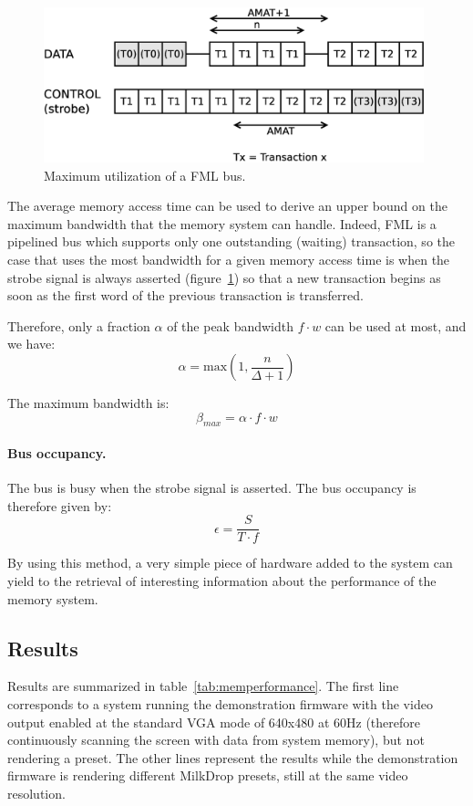 \documentclass[a4paper,11pt]{kthesis}
\begin{document}
\begin{figure}
\centering
\includegraphics[height=45mm]{fmlmax.eps}
\caption{Maximum utilization of a FML bus.} \label{fig:fmlmax}
\end{figure}

The average memory access time can be used to derive an upper bound on the maximum bandwidth that the memory system can handle. Indeed, FML is a pipelined bus which supports only one outstanding (waiting) transaction, so the case that uses the most bandwidth for a given memory access time is when the strobe signal is always asserted (figure~\ref{fig:fmlmax}) so that a new transaction begins as soon as the first word of the previous transaction is transferred.

Therefore, only a fraction $\alpha$ of the peak bandwidth $f \cdot w$ can be used at most, and we have:
\begin{equation}
\alpha = \textrm{max}(1, \frac{n}{\Delta+1})
\end{equation}

The maximum bandwidth is:
\begin{equation}
\beta_{max} = \alpha \cdot f \cdot w
\end{equation}

\paragraph{Bus occupancy.} The bus is busy when the strobe signal is asserted. The bus occupancy is therefore given by:
\begin{equation}
\epsilon = \frac{S}{T \cdot f}
\end{equation}

By using this method, a very simple piece of hardware added to the system can yield to the retrieval of interesting information about the performance of the memory system.

\subsection{Results}
Results are summarized in table~\ref{tab:memperformance}. The first line corresponds to a system running the demonstration firmware with the video output enabled at the standard VGA mode of 640x480 at 60Hz (therefore continuously scanning the screen with data from system memory), but not rendering a preset. The other lines represent the results while the demonstration firmware is rendering different MilkDrop presets, still at the same video resolution.
\end{document}
